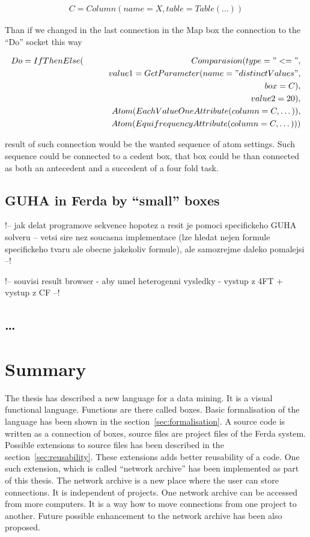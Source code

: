 \documentclass[a4paper,12pt]{book}
\begin{document}
\begin{eqnarray*}
C=Column(name=X, table=Table(\dots))
\end{eqnarray*}

Than if we changed in the last connection in the Map box the connection to the ``Do'' socket this way

\begin{eqnarray*}
Do=IfThenElse(&&Comparasion(type="<=", \\&&\qquad value1=GetParameter(name="distinctValues", \\&&\qquad\qquad box=C), \\&&\qquad value2=20),\\&&Atom(EachValueOneAttribute(column=C,\dots)),\\&&Atom(EquifrequencyAttribute(column=C,\dots)))
\end{eqnarray*}

result of such connection would be the wanted sequence of atom settings. Such sequence could be connected to a cedent box, that box could be than connected as both an antecedent and a succedent of a four fold task.

\section{GUHA in Ferda by ``small'' boxes}
!-- jak delat programove sekvence hopotez a resit je pomoci specifickeho GUHA solveru -- vetsi sire nez soucasna implementace (lze hledat nejen formule specifickeho tvaru ale obecne jakekoliv formule), ale samozrejme daleko pomalejsi --!

!-- souvisi result browser - aby umel heterogenni vysledky - vystup z 4FT + vystup z CF --!

\section{\dots}
\chapter{Summary}
The thesis has described a new language for a data mining. It is a visual functional language. Functions are there called boxes. Basic formalisation of the language has been shown in the section~\ref{sec:formalisation}. A source code is written as a connection of boxes, source files are project files of the Ferda system. Possible extensions to source files has been described in the section~\ref{sec:reusability}. These extensions adds better reusability of a code. One such extension, which is called ``network archive'' has been implemented as part of this thesis. The network archive is a new place where the user can store connections. It is independent of projects. One network archive can be accessed from more computers. It is a way how to move connections from one project to another. Future possible enhancement to the network archive has been also proposed.
\end{document}

